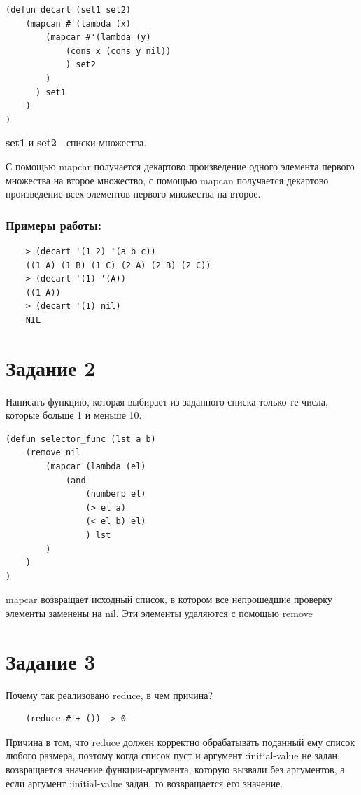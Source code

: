 \documentclass[a4paper, 12pt]{article}
\begin{document}
\begin{lstlisting}[caption=Функция вычисления декартова произведения]
(defun decart (set1 set2)
	(mapcan #'(lambda (x)
		(mapcar #'(lambda (y) 
			(cons x (cons y nil))
			) set2
		)
	  ) set1
	)
)
\end{lstlisting}
\textbf{set1} и \textbf{set2} - списки-множества.

С помощью mapcar получается декартово произведение одного элемента первого множества на второе множество, с помощью mapcan получается декартово произведение всех элементов первого множества на второе.

\subsubsection*{Примеры работы:}
\begin{lstlisting}
	> (decart '(1 2) '(a b c))
	((1 A) (1 B) (1 C) (2 A) (2 B) (2 C))
	> (decart '(1) '(A))
	((1 A))
	> (decart '(1) nil)
	NIL
\end{lstlisting}


\section*{Задание 2}
Написать функцию, которая выбирает из заданного списка только те числа, которые больше 1 и меньше 10.

\begin{lstlisting}
(defun selector_func (lst a b)
	(remove nil 
		(mapcar (lambda (el) 
			(and 
				(numberp el) 
				(> el a) 
				(< el b) el)
				) lst
		)
	)
)

\end{lstlisting}
mapcar возвращает исходный список, в котором все непрошедшие проверку элементы заменены на nil. Эти элементы удаляются с помощью remove


\section*{Задание 3}
Почему так реализовано reduce, в чем причина?
\begin{lstlisting}
	(reduce #'+ ()) -> 0
\end{lstlisting}

Причина в том, что reduce должен корректно обрабатывать поданный ему список любого размера, поэтому когда список пуст и аргумент :initial-value не задан,  возвращается значение функции-аргумента, которую вызвали без аргументов, а если аргумент :initial-value задан, то возвращается его значение.
\end{document}
